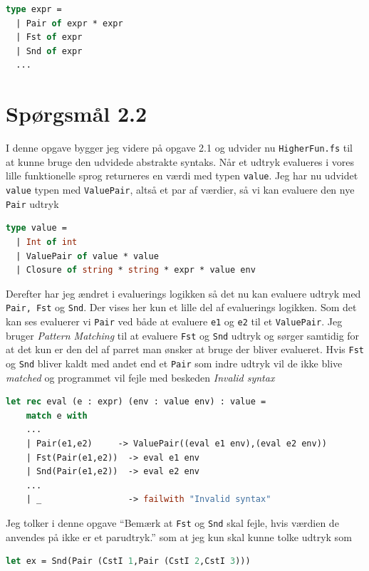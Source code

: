 \documentclass[danish,a4paper]{report}
\begin{document}
\begin{lstlisting}[language=ML]
type expr = 
  | Pair of expr * expr
  | Fst of expr 
  | Snd of expr 
  ...
\end{lstlisting}

\section*{Spørgsmål 2.2}

I denne opgave bygger jeg videre på opgave 2.1 og udvider nu \texttt{HigherFun.fs} til at kunne bruge den udvidede abstrakte syntaks. Når et udtryk evalueres i vores lille funktionelle sprog returneres en værdi med typen \texttt{value}. Jeg har nu udvidet \texttt{value} typen med \texttt{ValuePair}, altså et par af værdier, så vi kan evaluere den nye \texttt{Pair} udtryk

\begin{lstlisting}[language=ML]
type value = 
  | Int of int
  | ValuePair of value * value
  | Closure of string * string * expr * value env
\end{lstlisting}

Derefter har jeg ændret i evaluerings logikken så det nu kan evaluere udtryk med \texttt{Pair, Fst} og \texttt{Snd}. Der vises her kun et lille del af evaluerings logikken. Som det kan ses evaluerer vi \texttt{Pair} ved både at evaluere \texttt{e1} og \texttt{e2} til et \texttt{ValuePair}. Jeg bruger \textit{Pattern Matching} til at evaluere \texttt{Fst} og \texttt{Snd} udtryk og sørger samtidig for at det kun er den del af parret man ønsker at bruge der bliver evalueret. Hvis \texttt{Fst} og \texttt{Snd} bliver kaldt med andet end et \texttt{Pair} som indre udtryk vil de ikke blive \textit{matched} og programmet vil fejle med beskeden \textit{Invalid syntax}


\begin{lstlisting}[language=ML]
let rec eval (e : expr) (env : value env) : value =
    match e with
    ...
    | Pair(e1,e2)     -> ValuePair((eval e1 env),(eval e2 env)) 
    | Fst(Pair(e1,e2))  -> eval e1 env
    | Snd(Pair(e1,e2))  -> eval e2 env
    ...
    | _                 -> failwith "Invalid syntax"
\end{lstlisting}

Jeg tolker i denne opgave ``Bemærk at \texttt{Fst} og \texttt{Snd} skal fejle, hvis værdien de anvendes på ikke er et parudtryk.'' som at jeg kun skal kunne tolke udtryk som

\begin{lstlisting}[language=ML]
let ex = Snd(Pair (CstI 1,Pair (CstI 2,CstI 3)))
\end{lstlisting}
\end{document}
